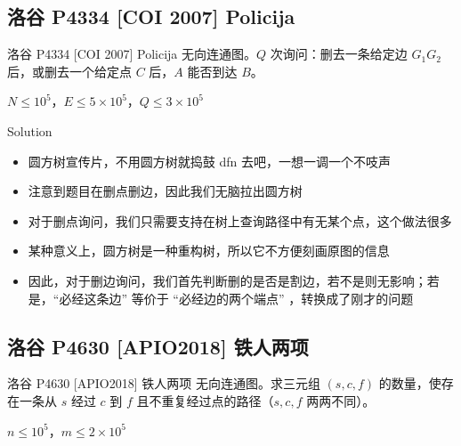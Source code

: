 ﻿\documentclass[aspectratio=169]{ctexbeamer}
\begin{document}
\subsection{洛谷 P4334 [COI 2007] Policija}

\begin{frame}{洛谷 P4334 [COI 2007] Policija}
      无向连通图。$Q$ 次询问：删去一条给定边 $G_1G_2$ 后，或删去一个给定点 $C$ 后，$A$ 能否到达 $B$。
      
      $N\le 10^5$，$E\le 5\times 10^5$，$Q\le 3\times 10^5$
\end{frame}

\begin{frame}{Solution}
    \begin{itemize}
        \item 圆方树宣传片，不用圆方树就捣鼓 dfn 去吧，一想一调一个不吱声
        \item 注意到题目在删点删边，因此我们无脑拉出圆方树
        \item 对于删点询问，我们只需要支持在树上查询路径中有无某个点，这个做法很多
        \item 某种意义上，圆方树是一种重构树，所以它不方便刻画原图的信息
        \item 因此，对于删边询问，我们首先判断删的是否是割边，若不是则无影响；若是，“必经这条边” 等价于 “必经边的两个端点” ，转换成了刚才的问题
    \end{itemize}    
\end{frame}








\subsection{洛谷 P4630 [APIO2018] 铁人两项}

\begin{frame}{洛谷 P4630 [APIO2018] 铁人两项}
      无向连通图。求三元组 $(s,c,f)$ 的数量，使存在一条从 $s$ 经过 $c$ 到 $f$ 且不重复经过点的路径（$s,c,f$ 两两不同）。
      
      $n\le 10^5$，$m\le 2\times 10^5$
\end{frame}
\end{document}

